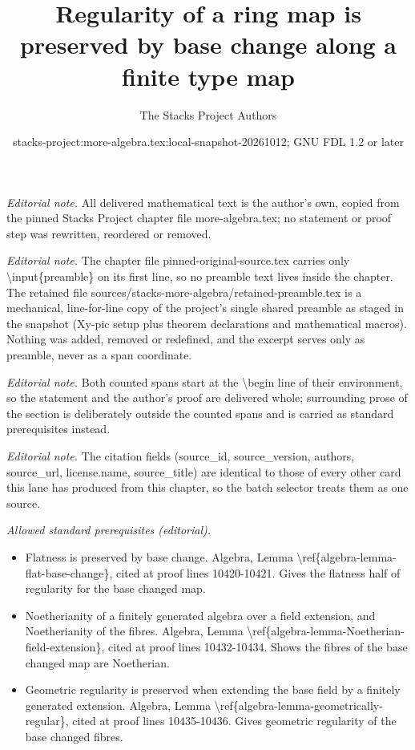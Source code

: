 \documentclass[10pt,a4paper]{amsart}
\title{Regularity of a ring map is preserved by base change along a finite type map}
\author{The Stacks Project Authors}
\date{stacks-project:more-algebra.tex:local-snapshot-20261012; GNU FDL 1.2 or later}
\theoremstyle{plain}
\theoremstyle{definition}
\theoremstyle{remark}
\numberwithin{equation}{subsection}
\begin{document}
\maketitle
\setcounter{subsection}{1}
\noindent\textit{Editorial note.} All delivered mathematical text is the author's own, copied from the pinned Stacks Project chapter file more-algebra.tex; no statement or proof step was rewritten, reordered or removed.\par\medskip
\noindent\textit{Editorial note.} The chapter file pinned-original-source.tex carries only \textbackslash{}input\{preamble\} on its first line, so no preamble text lives inside the chapter. The retained file sources/stacks-more-algebra/retained-preamble.tex is a mechanical, line-for-line copy of the project's single shared preamble as staged in the snapshot (Xy-pic setup plus theorem declarations and mathematical macros). Nothing was added, removed or redefined, and the excerpt serves only as preamble, never as a span coordinate.\par\medskip
\noindent\textit{Editorial note.} Both counted spans start at the \textbackslash{}begin line of their environment, so the statement and the author's proof are delivered whole; surrounding prose of the section is deliberately outside the counted spans and is carried as standard prerequisites instead.\par\medskip
\noindent\textit{Editorial note.} The citation fields (source\_id, source\_version, authors, source\_url, license.name, source\_title) are identical to those of every other card this lane has produced from this chapter, so the batch selector treats them as one source.\par\medskip
\noindent\textit{Allowed standard prerequisites (editorial).}\begin{itemize}
\item Flatness is preserved by base change. Algebra, Lemma \textbackslash{}ref\{algebra-lemma-flat-base-change\}, cited at proof lines 10420-10421. Gives the flatness half of regularity for the base changed map.
\item Noetherianity of a finitely generated algebra over a field extension, and Noetherianity of the fibres. Algebra, Lemma \textbackslash{}ref\{algebra-lemma-Noetherian-field-extension\}, cited at proof lines 10432-10434. Shows the fibres of the base changed map are Noetherian.
\item Geometric regularity is preserved when extending the base field by a finitely generated extension. Algebra, Lemma \textbackslash{}ref\{algebra-lemma-geometrically-regular\}, cited at proof lines 10435-10436. Gives geometric regularity of the base changed fibres.
\end{itemize}\medskip
\end{document}
